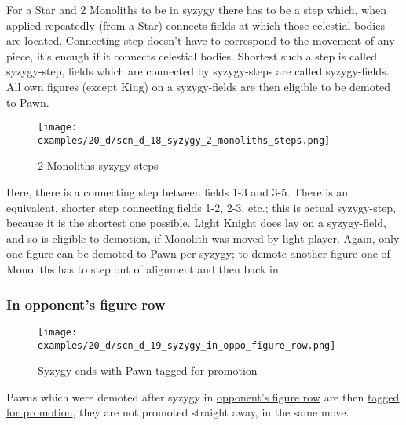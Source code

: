 For a Star and 2 Monoliths to be in syzygy there has to be a step which, when applied repeatedly (from a Star)
connects fields at which those celestial bodies are located. Connecting step doesn't have to correspond to the
movement of any piece, it's enough if it connects celestial bodies. Shortest such a step is called syzygy-step,
fields which are connected by syzygy-steps are called syzygy-fields. All own figures (except King) on a
syzygy-fields are then eligible to be demoted to Pawn.

\clearpage %

\noindent
\begin{figure}[!h]
\texttt{[image: examples/20\_d/scn\_d\_18\_syzygy\_2\_monoliths\_steps.png]}
\caption{2-Monoliths syzygy steps}
\label{fig:scn_d_18_syzygy_2_monoliths_steps}
\end{figure}

Here, there is a connecting step between fields 1-3 and 3-5. There is an equivalent, shorter step connecting fields
1-2, 2-3, etc.; this is actual syzygy-step, because it is the shortest one possible. Light Knight does lay on a
syzygy-field, and so is eligible to demotion, if Monolith was moved by light player. Again, only one figure can be
demoted to Pawn per syzygy; to demote another figure one of Monoliths has to step out of alignment and then back in.

\clearpage %

\subsubsection*{In opponent's figure row}

\vspace*{-1.2\baselineskip}
\noindent
\begin{figure}[!h]
\texttt{[image: examples/20\_d/scn\_d\_19\_syzygy\_in\_oppo\_figure\_row.png]}
\caption{Syzygy ends with Pawn tagged for promotion}
\label{fig:scn_d_19_syzygy_in_oppo_figure_row}
\end{figure}

Pawns which were demoted after syzygy in
\hyperref[fig:scn_aoa_14_pawn_figure_piece_rush_rows]{opponent's figure row}
are then \hyperref[sec:Age of Aquarius/Promotion]{tagged for promotion},
they are not promoted straight away, in the same move.


